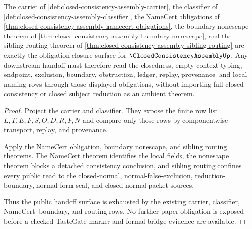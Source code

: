 \begin{theorem}
\label{thm:closed-consistency-assembly-obligation-handoff}
The carrier of \autoref{def:closed-consistency-assembly-carrier}, the classifier of \autoref{def:closed-consistency-assembly-classifier}, the NameCert obligations of \autoref{thm:closed-consistency-assembly-namecert-obligations}, the boundary nonescape theorem of \autoref{thm:closed-consistency-assembly-boundary-nonescape}, and the sibling routing theorem of \autoref{thm:closed-consistency-assembly-sibling-routing} are exactly the obligation-closure surface for $\ClosedConsistencyAssemblyUp$. Any downstream handoff must therefore read the closedness, empty-context typing, endpoint, exclusion, boundary, obstruction, ledger, replay, provenance, and local naming rows through those displayed obligations, without importing full closed consistency or closed subject reduction as an ambient theorem.
\end{theorem}
\begin{proof}
Project the carrier and classifier. They expose the finite row list $L,T,E,F,S,O,D,R,P,N$ and compare only those rows by componentwise transport, replay, and provenance.

Apply the NameCert obligation, boundary nonescape, and sibling routing theorems. The NameCert theorem identifies the local fields, the nonescape theorem blocks a detached consistency conclusion, and sibling routing confines every public read to the closed-normal, normal-false-exclusion, reduction-boundary, normal-form-seal, and closed-normal-packet sources.

Thus the public handoff surface is exhausted by the existing carrier, classifier, NameCert, boundary, and routing rows. No further paper obligation is exposed before a checked TasteGate marker and formal bridge evidence are available.
\end{proof}

